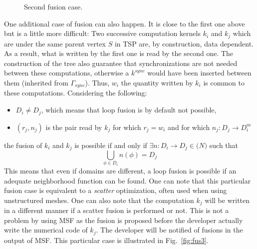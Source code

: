 \begin{figure}[h!]
\begin{center}
\caption{Second fusion case.}
\label{fig:fus2}
\end{center}
\end{figure}

One additional case of fusion can also happen. It is close to the first one above but is a little more difficult:
Two successive computation kernels $k_i$ and $k_j$ which are under the same parent vertex $S$ in TSP are, by construction, data dependent. As a result, what is written by the first one is read by the second one. The construction of the tree also guarantee that synchronizations are not needed between these computations, otherwise a $k^{sync}$ would have been inserted between them (inherited from $\Gamma_{sync}$). Thus, $w_i$ the quantity written by $k_i$ is common to these computations. Considering the following:
\begin{itemize}
\item $D_i \neq D_j$, which means that loop fusion is by default not possible,
\item $(r_j,n_j)$ is the pair read by $k_j$ for which $r_j=w_i$ and for which $n_j:D_j \rightarrow D_i^m$
\end{itemize}
the fusion of $k_i$ and $k_j$ is possible if and only if $\exists n:D_i \rightarrow D_j \in \mathcal(N)$ such that
\begin{equation*}
\bigcup_{\phi \in D_i} n(\phi) = D_j
\end{equation*}
This means that even if domains are different, a loop fusion is possible if an adequate neighborhood function can be found. One can note that this particular fusion case is equivalent to a \emph{scatter} optimization, often used when using unstructured meshes. One can also note that the computation $k_j$ will be written in a different manner if a scatter fusion is performed or not. This is not a problem by using MSF as the fusion is proposed before the developer actually write the numerical code of $k_j$. The developer will be notified of fusions in the output of MSF. This particular case is illustrated in Fig.~\ref{fig:fus3}.


